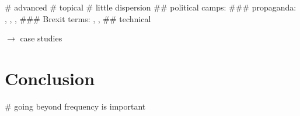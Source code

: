 \documentclass[
  a4paper,
  ]{scrartcl}
\begin{document}
      \begin{easylist}[itemize]
        # advanced
        # topical
        # little dispersion
          ## political camps:
            ### propaganda: , , , 
            ### Brexit terms: , , 
          ## technical
      \end{easylist}

    $\rightarrow$ case studies

\section{Conclusion}

  \begin{easylist}[itemize]
    # going beyond frequency is important
  \end{easylist}


  \printbibliography
\end{document}
